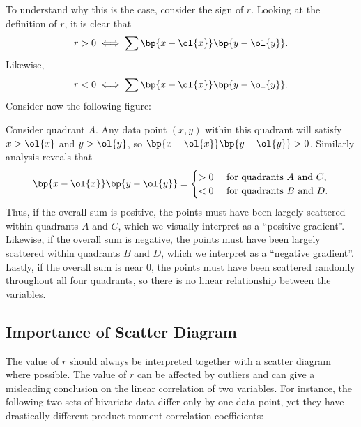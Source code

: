 To understand why this is the case, consider the sign of $r$. Looking at the definition of $r$, it is clear that \[r > 0 \iff \sum \bp{x - \ol{x}}\bp{y - \ol{y}}.\] Likewise, \[r < 0 \iff \sum \bp{x - \ol{x}}\bp{y - \ol{y}}.\] Consider now the following figure:

\begin{figure}[H]
\centering
{}
\caption{}
\end{figure}

Consider quadrant $A$. Any data point $(x, y)$ within this quadrant will satisfy $x > \ol{x}$ and $y > \ol{y}$, so $\bp{x - \ol{x}}\bp{y - \ol{y}} > 0$. Similarly analysis reveals that \[\bp{x - \ol{x}}\bp{y - \ol{y}} = \begin{cases}>0 & \text{ for quadrants $A$ and $C$},\\<0 & \text{ for quadrants $B$ and $D$}.\end{cases}\] Thus, if the overall sum is positive, the points must have been largely scattered within quadrants $A$ and $C$, which we visually interpret as a ``positive gradient''. Likewise, if the overall sum is negative, the points must have been largely scattered within quadrants $B$ and $D$, which we interpret as a ``negative gradient''. Lastly, if the overall sum is near 0, the points must have been scattered randomly throughout all four quadrants, so there is no linear relationship between the variables.

\subsection{Importance of Scatter Diagram}

The value of $r$ should always be interpreted together with a scatter diagram where possible. The value of $r$ can be affected by outliers and can give a misleading conclusion on the linear correlation of two variables. For instance, the following two sets of bivariate data differ only by one data point, yet they have drastically different product moment correlation coefficients:


